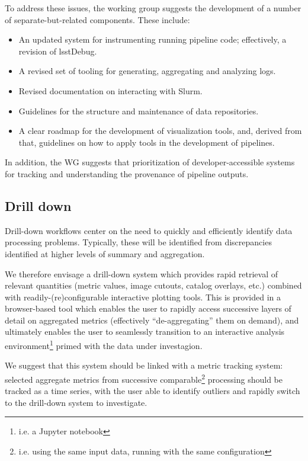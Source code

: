 To address these issues, the working group suggests the development of a
number of separate-but-related components. These include:

\begin{itemize}

  \item{An updated system for instrumenting running pipeline code;
  effectively, a revision of lsstDebug.}

  \item{A revised set of tooling for generating, aggregating and analyzing
  logs.}

  \item{Revised documentation on interacting with Slurm.}

  \item{Guidelines for the structure and maintenance of data repositories.}

  \item{A clear roadmap for the development of visualization tools, and,
  derived from that, guidelines on how to apply tools in the development of
  pipelines.}

\end{itemize}

In addition, the WG suggests that prioritization of developer-accessible
systems for tracking and understanding the provenance of pipeline outputs.

\subsection{Drill down}
\label{sec:design:drill}

Drill-down workflows center on the need to quickly and efficiently identify
data processing problems. Typically, these will be identified from
discrepancies identified at higher levels of summary and aggregation.

We therefore envisage a drill-down system which provides rapid retrieval of
relevant quantities (metric values, image cutouts, catalog overlays, etc.)
combined with readily-(re)configurable interactive plotting tools. This is
provided in a browser-based tool which enables the user to rapidly access
successive layers of detail on aggregated metrics (effectively
``de-aggregating'' them on demand), and ultimately enables the user to
seamlessly transition to an interactive analysis environment\footnote{i.e. a
Jupyter notebook} primed with the data under investagion.

We suggest that this system should be linked with a metric tracking system:
selected \glspl{aggregate metric} from successive comparable\footnote{i.e.
using the same input data, running with the same configuration} processing
should be tracked as a time series, with the user able to identify outliers
and rapidly switch to the drill-down system to investigate.

